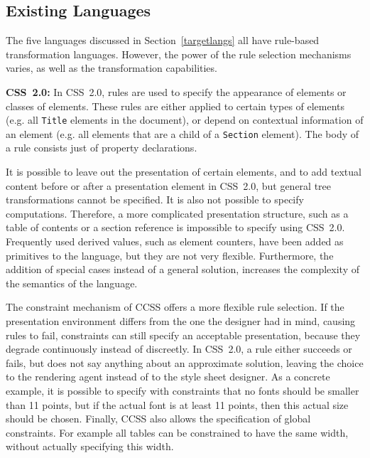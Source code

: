 %																
\subsection{Existing Languages}

The five languages discussed in Section~\ref{targetlangs} all have rule-based transformation languages. However, the power of the rule selection mechanisms varies, as well as the transformation capabilities.{\bf }

{\bf CSS~2.0:} In CSS~2.0, rules are used to specify the appearance of elements or classes of elements. These rules are either applied to certain types of elements (e.g. all \texttt{Title} elements in the document), or depend on contextual information of an element (e.g. all elements that are a child of a \texttt{Section} element). The body of a rule consists just of property declarations.

It is possible to leave out the presentation of certain elements, and to add textual content before or after a presentation element in CSS~2.0, but general tree transformations cannot be specified. It is also not possible to specify computations. Therefore, a more complicated presentation structure, such as a table of contents or a section reference is impossible to specify using CSS~2.0. Frequently used derived values, such as element counters, have been added as primitives to the language, but they are not very flexible. Furthermore, the addition of special cases instead of a general solution, increases the complexity of the semantics of the language.

 The constraint mechanism of CCSS offers a more flexible rule selection. If the presentation environment differs from the one the designer had in mind, causing rules to fail, constraints can still specify an acceptable presentation, because they degrade continuously instead of discreetly. In CSS~2.0, a rule either succeeds or fails, but does not say anything about an approximate solution, leaving the choice to the rendering agent instead of to the style sheet designer. As a concrete example, it is possible to specify with constraints that no fonts should be smaller than 11 points, but if the actual font is at least 11 points, then this actual size should be chosen. Finally, CCSS also allows the specification of global constraints. For example all tables can be constrained to have the same width, without actually specifying this width.

